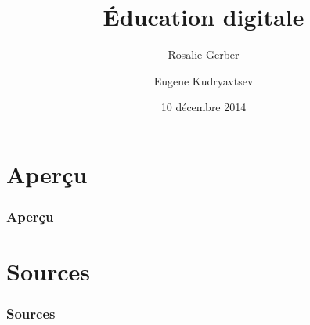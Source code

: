 \documentclass{beamer}
\title{Éducation digitale }
\author[Rosalie G. \and Eugene K.]{Rosalie Gerber \and Eugene Kudryavtsev}
\date{10 décembre 2014}
\institute[]{Haute école spécialisée bernoise}
\begin{document}
    \begin{frame}
        \titlepage
    \end{frame}

    \section*{Aperçu}
    \begin{frame}
        \frametitle{Aperçu}
        \tableofcontents
    \end{frame}

    \section*{Sources}
    \begin{frame}
        \frametitle{Sources}
    \end{frame}
    
\end{document}
